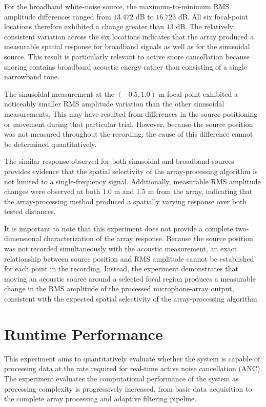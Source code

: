 For the broadband white-noise source, the maximum-to-minimum RMS amplitude differences ranged from $13.472$ dB to $16.723$ dB. All six focal-point locations therefore exhibited a change greater than $13$ dB. The relatively consistent variation across the six locations indicates that the array produced a measurable spatial response for broadband signals as well as for the sinusoidal source. This result is particularly relevant to active snore cancellation because snoring contains broadband acoustic energy rather than consisting of a single narrowband tone.

The sinusoidal measurement at the $(-0.5,1.0)$ m focal point exhibited a noticeably smaller RMS amplitude variation than the other sinusoidal measurements. This may have resulted from differences in the source positioning or movement during that particular trial. However, because the source position was not measured throughout the recording, the cause of this difference cannot be determined quantitatively.

The similar response observed for both sinusoidal and broadband sources provides evidence that the spatial selectivity of the array-processing algorithm is not limited to a single-frequency signal. Additionally, measurable RMS amplitude changes were observed at both $1.0$ m and $1.5$ m from the array, indicating that the array-processing method produced a spatially varying response over both tested distances.

It is important to note that this experiment does not provide a complete
two-dimensional characterization of the array response. Because the source position was not recorded simultaneously with the acoustic measurement, an exact relationship between source position and RMS amplitude cannot be established for each point in the recording. Instead, the experiment demonstrates that moving an acoustic source around a selected focal region produces a measurable change in the RMS amplitude of the processed microphone-array output, consistent with the expected spatial selectivity of the array-processing algorithm.

\section{Runtime Performance}

This experiment aims to quantitatively evaluate whether the system is capable of processing data at the rate required for real-time active noise cancellation (ANC). The experiment evaluates the computational performance of the system as processing complexity is progressively increased, from basic data acquisition to the complete array processing and adaptive filtering pipeline.

